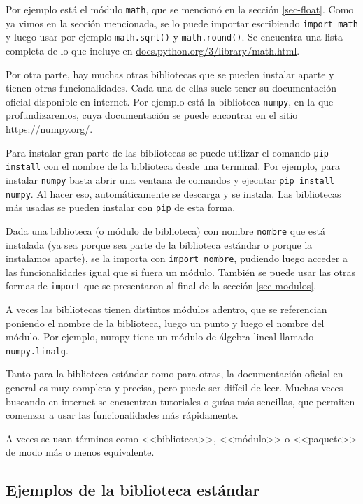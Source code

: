 \documentclass[a4paper, 12pt]{report}
\theoremstyle{definition}
\begin{document}
Por ejemplo está el módulo {\tt math}, que se mencionó en la sección \ref{sec-float}. Como ya vimos en la sección mencionada, se lo puede importar escribiendo {\tt import math} y luego usar por ejemplo {\tt math.sqrt()} y {\tt math.round()}. Se encuentra una lista completa de lo que incluye en \href{https://docs.python.org/3/library/math.html}{docs.python.org/3/library/math.html}.

Por otra parte, hay muchas otras bibliotecas que se pueden instalar aparte y tienen otras funcionalidades. Cada una de ellas suele tener su documentación oficial disponible en internet. Por ejemplo está la biblioteca {\tt numpy}, en la que profundizaremos, cuya documentación se puede encontrar en el sitio \href{https://numpy.org/}{https://numpy.org/}.

Para instalar gran parte de las bibliotecas se puede utilizar el comando {\tt pip install} con el nombre de la biblioteca desde una terminal. Por ejemplo, para instalar {\tt numpy} basta abrir una ventana de comandos y ejecutar {\tt pip install numpy}. Al hacer eso, automáticamente se descarga y se instala. Las bibliotecas más usadas se pueden instalar con {\tt pip} de esta forma.

Dada una biblioteca (o módulo de biblioteca) con nombre {\tt nombre} que está instalada (ya sea porque sea parte de la biblioteca estándar o porque la instalamos aparte), se la importa con {\tt import nombre}, pudiendo luego acceder a las funcionalidades igual que si fuera un módulo. También se puede usar las otras formas de {\tt import} que se presentaron al final de la sección \ref{sec-modulos}.

A veces las bibliotecas tienen distintos módulos adentro, que se referencian poniendo el nombre de la biblioteca, luego un punto y luego el nombre del módulo. Por ejemplo, numpy tiene un módulo de álgebra lineal  llamado {\tt numpy.linalg}.

Tanto para la biblioteca estándar como para otras, la documentación oficial en general es muy completa y precisa, pero puede ser difícil de leer. Muchas veces buscando en internet se encuentran tutoriales o guías más sencillas, que permiten comenzar a usar las funcionalidades más rápidamente.

A veces se usan términos como <<biblioteca>>, <<módulo>> o <<paquete>> de modo más o menos equivalente.

\subsection{Ejemplos de la biblioteca estándar}
\end{document}
